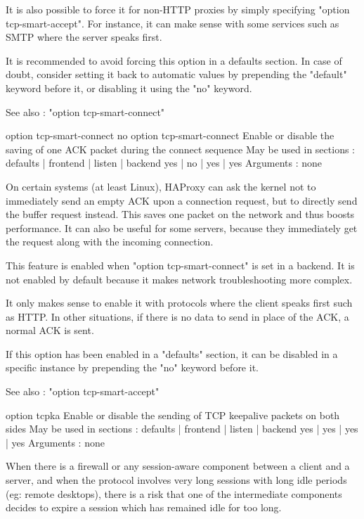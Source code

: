   It is also possible to force it for non-HTTP proxies by simply specifying
  "option tcp-smart-accept". For instance, it can make sense with some services
  such as SMTP where the server speaks first.

  It is recommended to avoid forcing this option in a defaults section. In case
  of doubt, consider setting it back to automatic values by prepending the
  "default" keyword before it, or disabling it using the "no" keyword.

  See also : "option tcp-smart-connect"


option tcp-smart-connect
no option tcp-smart-connect
  Enable or disable the saving of one ACK packet during the connect sequence
  May be used in sections :   defaults | frontend | listen | backend
                                 yes   |    no    |   yes  |   yes
  Arguments : none

  On certain systems (at least Linux), HAProxy can ask the kernel not to
  immediately send an empty ACK upon a connection request, but to directly
  send the buffer request instead. This saves one packet on the network and
  thus boosts performance. It can also be useful for some servers, because they
  immediately get the request along with the incoming connection.

  This feature is enabled when "option tcp-smart-connect" is set in a backend.
  It is not enabled by default because it makes network troubleshooting more
  complex.

  It only makes sense to enable it with protocols where the client speaks first
  such as HTTP. In other situations, if there is no data to send in place of
  the ACK, a normal ACK is sent.

  If this option has been enabled in a "defaults" section, it can be disabled
  in a specific instance by prepending the "no" keyword before it.

  See also : "option tcp-smart-accept"


option tcpka
  Enable or disable the sending of TCP keepalive packets on both sides
  May be used in sections :   defaults | frontend | listen | backend
                                 yes   |    yes   |   yes  |   yes
  Arguments : none

  When there is a firewall or any session-aware component between a client and
  a server, and when the protocol involves very long sessions with long idle
  periods (eg: remote desktops), there is a risk that one of the intermediate
  components decides to expire a session which has remained idle for too long.

